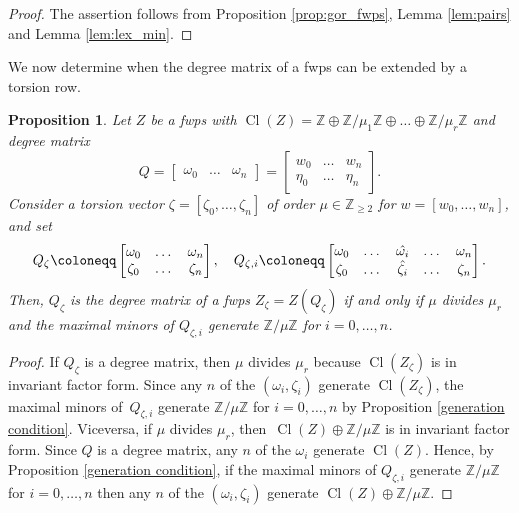 \documentclass{amsart}
\DeclareMathOperator{\Cl}{Cl}
\newcommand{\Z}{\mathbb{Z}}
\newtheorem{proposition}[lem]{Proposition}
\theoremstyle{definition}
\begin{document}
\begin{proof}
    The assertion follows from Proposition \ref{prop:gor_fwps}, Lemma \ref{lem:pairs} and  Lemma \ref{lem:lex_min}.
\end{proof}

We now determine when the degree matrix of a fwps can be extended by a torsion row.

\begin{proposition}\label{prop:gluing}
    Let $Z$ be a fwps with $\Cl(Z)=\Z\oplus\Z/\mu_1\Z\oplus\dots\oplus\Z/\mu_r\Z$ and degree matrix $$Q=\begin{bmatrix}
        \omega_0 & \dots & \omega_n
    \end{bmatrix}=\begin{bmatrix}
        w_0 & \dots & w_n\\
        \eta_{0} & \dots & \eta_{n}
    \end{bmatrix}.$$
    Consider a torsion vector $\zeta=[\zeta_0,\dots,\zeta_n]$ of order $\mu\in\Z_{\geq 2}$ for $w=[w_0,\dots,w_n]$, and set
    $$
    Q_\zeta\coloneqq\begin{bmatrix}
        \omega_0 & \dots & \omega_n \\
        \zeta_0 & \dots & \zeta_n
    \end{bmatrix},\quad Q_{\zeta,i}\coloneqq\begin{bmatrix}
        \omega_0 & \dots & \hat{\omega_i} & \dots & \omega_n \\
        \zeta_0 & \dots & \hat{\zeta_i} & \dots & \zeta_n
    \end{bmatrix}.\\[3pt]
    $$
    Then, $Q_\zeta$ is the degree matrix of a fwps $Z_\zeta=Z(Q_\zeta)$ if and only if $\mu$ divides $\mu_r$ and the maximal minors of $Q_{\zeta,i}$ generate $\Z/\mu\Z$ for $i=0,\dots,n$.
\end{proposition}

\begin{proof}
    If $Q_\zeta$ is a degree matrix, then $\mu$ divides $\mu_r$ because $\Cl(Z_\zeta)$ is in invariant factor form. Since any $n$ of the $(\omega_i,\zeta_i)$ generate $\Cl(Z_\zeta)$, the maximal minors of~$Q_{\zeta,i}$ generate $\Z/\mu\Z$ for $i=0,\dots,n$ by Proposition \ref{generation condition}. Viceversa, if $\mu$ divides $\mu_r$,  then~$\Cl(Z)\oplus \Z/\mu\Z$ is in invariant factor form. Since $Q$ is a degree matrix, any $n$ of the $\omega_i$ generate $\Cl(Z)$. Hence, by Proposition \ref{generation condition}, if the maximal minors of $Q_{\zeta,i}$ generate $\Z/\mu\Z$ for $i=0,\dots,n$ then any $n$ of the $(\omega_i,\zeta_i)$ generate $\Cl(Z)\oplus \Z/\mu\Z$.
\end{proof}
\end{document}

